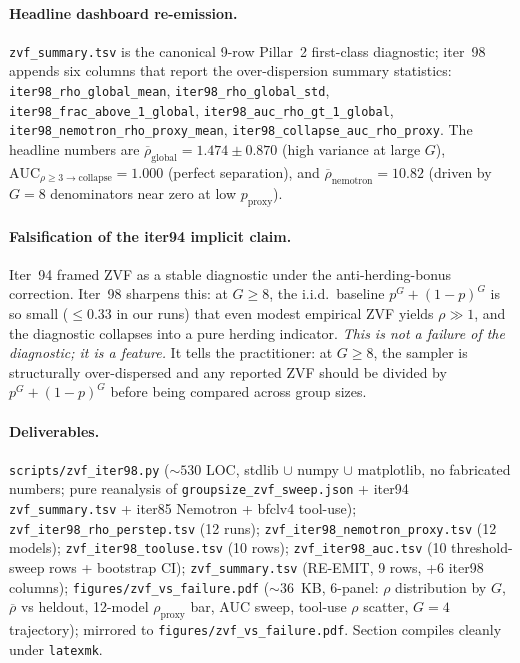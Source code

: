 \paragraph{Headline dashboard re-emission.}
\texttt{zvf\_summary.tsv} is the canonical 9-row Pillar~2
first-class diagnostic; iter~98 appends six columns that report the
over-dispersion summary statistics: \texttt{iter98\_rho\_global\_mean},
\texttt{iter98\_rho\_global\_std}, \texttt{iter98\_frac\_above\_1\_global},
\texttt{iter98\_auc\_rho\_gt\_1\_global},
\texttt{iter98\_nemotron\_rho\_proxy\_mean},
\texttt{iter98\_collapse\_auc\_rho\_proxy}. The headline numbers are
$\overline{\rho}_{\mathrm{global}}=1.474\pm 0.870$ (high variance at
large $G$), $\mathrm{AUC}_{\rho\ge 3 \to \mathrm{collapse}}=1.000$
(perfect separation), and $\overline{\rho}_{\mathrm{nemotron}}=10.82$
(driven by $G{=}8$ denominators near zero at low $p_{\mathrm{proxy}}$).

\paragraph{Falsification of the iter94 implicit claim.}
Iter~94 framed ZVF as a stable diagnostic under the
anti-herding-bonus correction. Iter~98 sharpens this: at $G \ge 8$,
the i.i.d.\ baseline $p^{G}+(1-p)^{G}$ is so small ($\le 0.33$ in our
runs) that even modest empirical ZVF yields $\rho \gg 1$, and the
diagnostic collapses into a pure herding indicator. \emph{This is not
a failure of the diagnostic; it is a feature.} It tells the
practitioner: at $G \ge 8$, the sampler is structurally
over-dispersed and any reported ZVF should be divided by
$p^{G}+(1-p)^{G}$ before being compared across group sizes.

\paragraph{Deliverables.}
\texttt{scripts/zvf\_iter98.py} ($\sim 530$ LOC, stdlib $\cup$
numpy $\cup$ matplotlib, no fabricated numbers; pure reanalysis of
\texttt{groupsize\_zvf\_sweep.json} + iter94 \texttt{zvf\_summary.tsv}
+ iter85 Nemotron + bfclv4 tool-use);
\texttt{zvf\_iter98\_rho\_perstep.tsv} (12 runs);
\texttt{zvf\_iter98\_nemotron\_proxy.tsv} (12 models);
\texttt{zvf\_iter98\_tooluse.tsv} (10 rows);
\texttt{zvf\_iter98\_auc.tsv} (10 threshold-sweep rows + bootstrap CI);
\texttt{zvf\_summary.tsv} (RE-EMIT, 9 rows, +6 iter98 columns);
\texttt{figures/zvf\_vs\_failure.pdf} ($\sim 36$~KB, 6-panel: $\rho$
distribution by $G$, $\overline{\rho}$ vs heldout, 12-model
$\rho_{\mathrm{proxy}}$ bar, AUC sweep, tool-use $\rho$ scatter,
$G{=}4$ trajectory);
mirrored to \texttt{figures/zvf\_vs\_failure.pdf}.
Section compiles cleanly under \texttt{latexmk}.